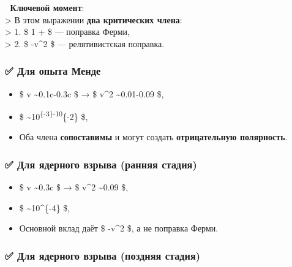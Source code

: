 \documentclass[11pt]{article}
\providecommand{\tightlist}{%
      \setlength{\itemsep}{0pt}\setlength{\parskip}{0pt}}
\begin{document}
📌 \textbf{Ключевой момент}:\\
\textgreater{} В этом выражении \textbf{два критических члена}:\\
\textgreater{} 1. \$ 1 +  \$ ---
поправка Ферми,\\
\textgreater{} 2. \$ -v\^{}2 \$ --- релятивистская поправка.

\subsubsection{✅ Для опыта
Менде}\label{ux434ux43bux44f-ux43eux43fux44bux442ux430-ux43cux435ux43dux434ux435}

\begin{itemize}
\tightlist
\item
  \$ v \sim 0.1c-0.3c \$ → \$ v\^{}2 \sim 0.01-0.09 \$,\\
\item
  \$ 
  \sim 10\textsuperscript{\{-3\}-10}\{-2\} \$,\\
\item
  Оба члена \textbf{сопоставимы} и могут создать \textbf{отрицательную
  полярность}.
\end{itemize}

\subsubsection{✅ Для ядерного взрыва (ранняя
стадия)}\label{ux434ux43bux44f-ux44fux434ux435ux440ux43dux43eux433ux43e-ux432ux437ux440ux44bux432ux430-ux440ux430ux43dux43dux44fux44f-ux441ux442ux430ux434ux438ux44f}

\begin{itemize}
\tightlist
\item
  \$ v \sim 0.3c \$ → \$ v\^{}2 \sim 0.09 \$,\\
\item
  \$  \sim 10\^{}\{-4\} \$,\\
\item
  Основной вклад даёт \$ -v\^{}2 \$, а не поправка Ферми.
\end{itemize}

\subsubsection{✅ Для ядерного взрыва (поздняя
стадия)}\label{ux434ux43bux44f-ux44fux434ux435ux440ux43dux43eux433ux43e-ux432ux437ux440ux44bux432ux430-ux43fux43eux437ux434ux43dux44fux44f-ux441ux442ux430ux434ux438ux44f}
\end{document}
